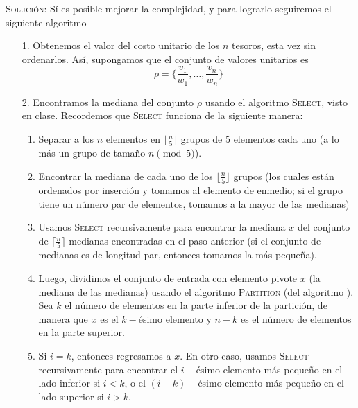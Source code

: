\documentclass[letterpaper,11pt]{article}
\begin{document}
\begin{enumerate}
\begin{itemize}
        \textsc{Solución:} Sí es posible mejorar la complejidad, y para lograrlo 
        seguiremos el siguiente algoritmo
        \begin{itemize}
            \item[1.] Obtenemos el valor del costo unitario de los $n$ tesoros, 
            esta vez sin ordenarlos. Así, supongamos que el conjunto de valores 
            unitarios es 
            \begin{equation*}
                \rho = \{\frac{v_1}{w_1}, \ldots, \frac{v_n}{w_n}\}
            \end{equation*}

            \item[2.] Encontramos la mediana del conjunto $\rho$ usando el 
            algoritmo \textsc{Select}, visto en clase. Recordemos que 
            \textsc{Select} funciona de la siguiente manera:
            \begin{enumerate}
                \item Separar a los $n$ elementos en $\lfloor \frac{n}{5} \rfloor$ 
                grupos de $5$ elementos cada uno (a lo más un grupo de tamaño 
                $n \pmod{5}$).

                \item Encontrar la mediana de cada uno de los 
                $\lfloor \frac{n}{5} \rfloor$ grupos (los cuales están ordenados 
                por inserción y tomamos al elemento de enmedio; si el grupo tiene 
                un número par de elementos, tomamos a la mayor de las medianas)

                \item Usamos \textsc{Select} recursivamente para encontrar la 
                mediana $x$ del conjunto de $\lceil \frac{n}{5} \rceil$ medianas 
                encontradas en el paso anterior (si el conjunto de medianas es de 
                longitud par, entonces tomamos la más pequeña). 

                \item Luego, dividimos el conjunto de entrada con elemento pivote 
                $x$ (la mediana de las medianas) usando el algoritmo 
                \textsc{Partition} (del algoritmo ). Sea $k$ el 
                número de elementos en la parte inferior de la partición, de 
                manera que $x$ es el $k-$ésimo elemento y $n-k$ es el número de 
                elementos en la parte superior.

                \item Si $i = k$, entonces regresamos a $x$. En otro caso, 
                usamos \textsc{Select} recursivamente para encontrar el 
                $i-$ésimo elemento más pequeño en el lado inferior si $i < k$, o 
                el $(i-k)-$ésimo elemento más pequeño en el lado superior si 
                $i > k$.
            \end{enumerate}


\end{itemize}
\end{itemize}
\end{enumerate}
\end{document}
